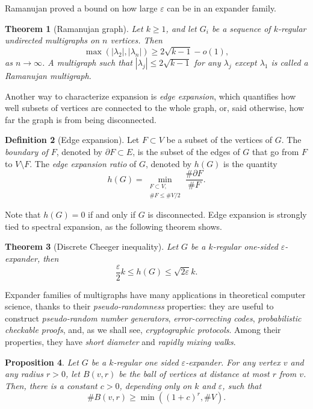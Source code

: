 \documentclass[10pt]{article}
\theoremstyle{plain}
\newtheorem{theorem}{Theorem}
\newtheorem{proposition}[theorem]{Proposition}
\theoremstyle{definition}
\newtheorem{definition}[theorem]{Definition}
\begin{document}
Ramanujan proved a bound on how large $ε$ can be in an expander
family. %

\begin{theorem}[Ramanujan graph]
  Let $k≥1$, and let $G_i$ be a sequence of $k$-regular undirected
  multigraphs on $n$ vertices. %
  Then
  \[\max(|λ_2|,|λ_n|) ≥ 2\sqrt{k-1} - o(1),\]
  as $n→∞$. %
  A multigraph such that $|λ_j|≤2\sqrt{k-1}$ for any $λ_j$ except
  $λ_1$ is called a \emph{Ramanujan multigraph}.
\end{theorem}

Another way to characterize expansion is \emph{edge expansion}, which
quantifies how well subsets of vertices are connected to the whole
graph, or, said otherwise, how far the graph is from being
disconnected.

\begin{definition}[Edge expansion]
  Let $F⊂V$ be a subset of the vertices of $G$. %
  The \emph{boundary of $F$}, denoted by $∂F⊂E$, is the subset of the
  edges of $G$ that go from $F$ to $V\setminus F$. %
  The \emph{edge expansion ratio} of $G$, denoted by $h(G)$ is the
  quantity
  \[h(G) = \min_{\substack{F⊂V,\\ \#F≤\#V/2}}\frac{\#∂F}{\#F}.\]
\end{definition}

Note that $h(G)=0$ if and only if $G$ is disconnected. %
Edge expansion is strongly tied to spectral expansion, as the
following theorem shows.

\begin{theorem}[Discrete Cheeger inequality]
  Let $G$ be a $k$-regular one-sided $ε$-expander, then
  \[\frac{ε}{2}k≤h(G)≤\sqrt{2ε}k.\]
\end{theorem}

Expander families of multigraphs have many applications in theoretical
computer science, thanks to their \emph{pseudo-randomness} properties:
they are useful to construct \emph{pseudo-random number generators},
\emph{error-correcting codes}, \emph{probabilistic checkable proofs},
and, as we shall see, \emph{cryptographic protocols}. %
Among their properties, they have \emph{short diameter} and
\emph{rapidly mixing walks}.

\begin{proposition}
  \label{th:diameter}
  Let $G$ be a $k$-regular one sided $ε$-expander. %
  For any vertex $v$ and any radius $r>0$, let $B(v,r)$ be the
  \emph{ball} of vertices at distance at most $r$ from $v$. %
  Then, there is a constant $c>0$, depending only on $k$ and $ε$, such
  that
  \[\#B(v,r)≥\min((1+c)^r,\#V).\]
\end{proposition}
\end{document}

